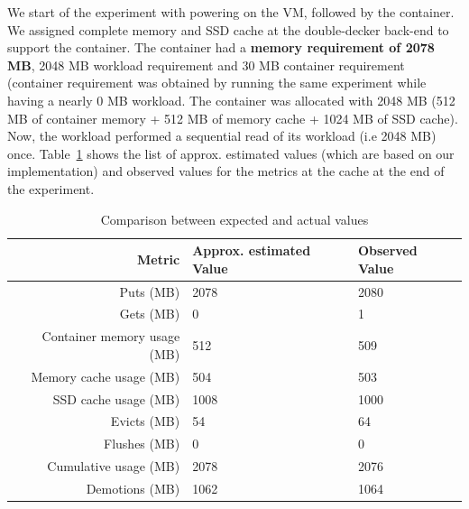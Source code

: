 	      We start of the experiment with powering on the VM, followed by the container. We assigned complete memory and SSD cache 
	    at the double-decker back-end to support the container. The container had a \textbf{memory requirement of 2078 MB}, 2048 MB workload
	    requirement and 30 MB container requirement (container requirement was obtained by running the same experiment while having
	    a nearly 0 MB workload. The container was allocated with 2048 MB (512 MB of container memory + 512 MB of memory cache 
	    + 1024 MB of SSD cache). Now, the workload performed a sequential read of its workload (i.e 2048 MB) once.
	    Table~\ref{table:correctness_memtossd} shows the list of approx. estimated values (which are based on our 
	    implementation) and observed values for the metrics at the cache at the end of the experiment. 
	    
	    \vspace*{1em}	
	      \begin{table}
		\begin{center}
		  \begin{tabular}{ r | p{4cm} | p{4cm} }	      	    
			Metric & Approx. estimated Value & Observed Value \\ 
		    \hline
		    \hline
		    Puts (MB) & 2078 & 2080 \\
		    \hline
		    Gets (MB) & 0 & 1 \\
		    \hline
		    Container memory usage (MB) & 512 & 509 \\  
		    \hline
		    Memory cache usage (MB) & 504 & 503 \\
		    \hline 
		    SSD cache usage (MB) & 1008 & 1000 \\
		    \hline
		    Evicts (MB) & 54  & 64 \\
		    \hline
		    Flushes (MB) & 0  & 0 \\
		    \hline
		    Cumulative usage (MB) & 2078 & 2076 \\
		    \hline
		    Demotions (MB) & 1062 & 1064 \\
		    \hline
		    
		  \end{tabular}
		\caption{Comparison between expected and actual values}
		\label{table:correctness_memtossd}
		\end{center}	  
	      \end{table}
	    \vspace*{1em}
	    
